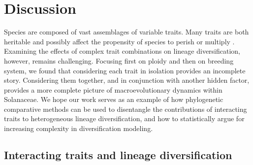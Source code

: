 \section{Discussion}

%
Species are composed of vast assemblages of variable traits.
Many traits are both heritable and possibly affect the propensity of species to perish or multiply \citep{lewontin_1970}.
Examining the effects of complex trait combinations on lineage diversification, however, remains challenging.
%
Focusing first on ploidy and then on breeding system, we found that considering each trait in isolation provides an incomplete story.
Considering them together, and in conjunction with another hidden factor, provides a more complete picture of macroevolutionary dynamics within Solanaceae.
We hope our work serves as an example of how phylogenetic comparative methods can be used to disentangle the contributions of interacting traits to heterogeneous lineage diversification, and how to statistically argue for increasing complexity in diversification modeling.

\subsection{Interacting traits and lineage diversification} 

